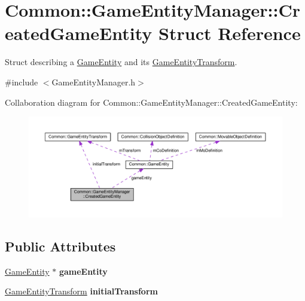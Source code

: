 \hypertarget{struct_common_1_1_game_entity_manager_1_1_created_game_entity}{}\section{Common\+:\+:Game\+Entity\+Manager\+:\+:Created\+Game\+Entity Struct Reference}
\label{struct_common_1_1_game_entity_manager_1_1_created_game_entity}


Struct describing a \hyperlink{struct_common_1_1_game_entity}{Game\+Entity} and its \hyperlink{struct_common_1_1_game_entity_transform}{Game\+Entity\+Transform}.  




{\ttfamily \#include $<$Game\+Entity\+Manager.\+h$>$}



Collaboration diagram for Common\+:\+:Game\+Entity\+Manager\+:\+:Created\+Game\+Entity\+:\nopagebreak
\begin{figure}[H]
\begin{center}
\leavevmode
\includegraphics[width=350pt]{struct_common_1_1_game_entity_manager_1_1_created_game_entity__coll__graph}
\end{center}
\end{figure}
\subsection*{Public Attributes}
\begin{DoxyCompactItemize}
\item 
\mbox{\label{struct_common_1_1_game_entity_manager_1_1_created_game_entity_aaa44339ada4d32556d43ad60f1620647}} 
\hyperlink{struct_common_1_1_game_entity}{Game\+Entity} $\ast$ {\bfseries game\+Entity}
\item 
\mbox{\label{struct_common_1_1_game_entity_manager_1_1_created_game_entity_a66e0bb365ab3e2396628eb7cc7748eb8}} 
\hyperlink{struct_common_1_1_game_entity_transform}{Game\+Entity\+Transform} {\bfseries initial\+Transform}
\end{DoxyCompactItemize}


